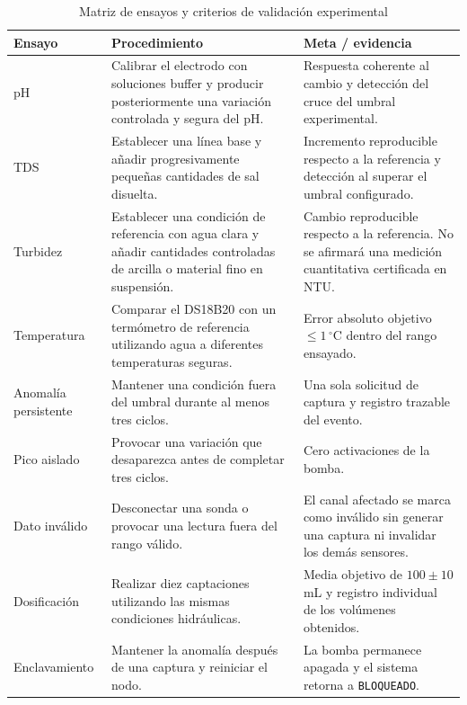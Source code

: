 \documentclass[11pt,a4paper]{article}
\begin{document}
{\small
\begin{longtable}{p{3cm}p{7.7cm}p{4.5cm}}

\caption{Matriz de ensayos y criterios de validación experimental}
\label{tab:validacion} \\

\toprule
Ensayo &
Procedimiento &
Meta / evidencia \\
\midrule
\endhead

pH &
Calibrar el electrodo con soluciones buffer y producir posteriormente una variación controlada y segura del pH. &
Respuesta coherente al cambio y detección del cruce del umbral experimental. \\

TDS &
Establecer una línea base y añadir progresivamente pequeñas cantidades de sal disuelta. &
Incremento reproducible respecto a la referencia y detección al superar el umbral configurado. \\

Turbidez &
Establecer una condición de referencia con agua clara y añadir cantidades controladas de arcilla o material fino en suspensión. &
Cambio reproducible respecto a la referencia. No se afirmará una medición cuantitativa certificada en NTU. \\

Temperatura &
Comparar el DS18B20 con un termómetro de referencia utilizando agua a diferentes temperaturas seguras. &
Error absoluto objetivo $\leq1\,^{\circ}$C dentro del rango ensayado. \\

Anomalía persistente &
Mantener una condición fuera del umbral durante al menos tres ciclos. &
Una sola solicitud de captura y registro trazable del evento. \\

Pico aislado &
Provocar una variación que desaparezca antes de completar tres ciclos. &
Cero activaciones de la bomba. \\

Dato inválido &
Desconectar una sonda o provocar una lectura fuera del rango válido. &
El canal afectado se marca como inválido sin generar una captura ni invalidar los demás sensores. \\

Dosificación &
Realizar diez captaciones utilizando las mismas condiciones hidráulicas. &
Media objetivo de $100 \pm 10$ mL y registro individual de los volúmenes obtenidos. \\

Enclavamiento &
Mantener la anomalía después de una captura y reiniciar el nodo. &
La bomba permanece apagada y el sistema retorna a \texttt{BLOQUEADO}. \\


\end{longtable}}
\end{document}
